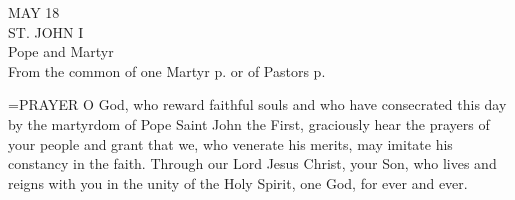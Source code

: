 \begin{center}\normalsize MAY 18\\
\footnotesize ST. JOHN I\\
\footnotesize Pope and Martyr\\
\footnotesize From the common of one Martyr p.  or of Pastors p. \\
\end{center}

\hangindent=\parindent \small{PRAYER 
O God, who reward faithful souls
and who have consecrated this day
by the martyrdom of Pope Saint John the First,
graciously hear the prayers of your people
and grant that we, who venerate his merits,
may imitate his constancy in the faith.
Through our Lord Jesus Christ, your Son,
who lives and reigns with you in the unity of the Holy Spirit,
one God, for ever and ever.\\}
 
